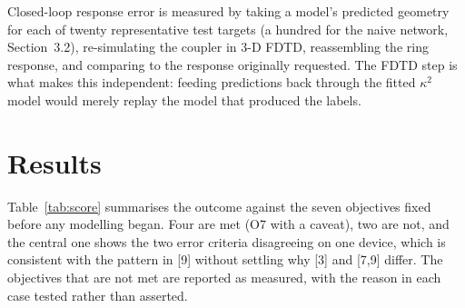 \documentclass[11pt]{article}
\begin{document}
Closed-loop response error is measured by taking a model's predicted geometry
for each of twenty representative test targets (a hundred for the naive
network, Section~3.2), re-simulating the coupler in
3-D FDTD, reassembling the ring response, and comparing to the response
originally requested. The FDTD step is what makes this independent: feeding
predictions back through the fitted $\kappa^2$ model would merely replay the
model that produced the labels.

\section{Results}

Table~\ref{tab:score} summarises the outcome against the seven objectives
fixed before any modelling began. Four are met (O7 with a caveat), two are not, and
the central one shows the two error criteria disagreeing on one device, which is
consistent with the pattern in [9] without settling why [3] and [7,9] differ. The objectives that are not
met are reported as measured, with the reason in each case tested rather than
asserted.
\end{document}

